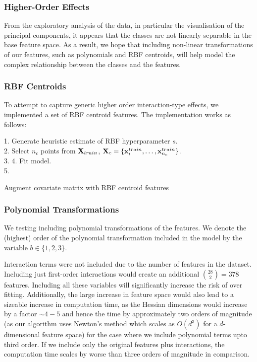 \subsubsection{Higher-Order Effects}
From the exploratory analysis of the data, in particular the visualisation of the principal components, it appears that the classes are not linearly separable in the base feature space. As a result, we hope that including non-linear transformations of our features, such as polynomials and RBF centroids, will help model the complex relationship between the classes and the features.

\subsubsection{RBF Centroids}
To attempt to capture generic higher order interaction-type effects, we implemented a set of RBF centroid features. The implementation works as follows: \newline
\begin{algorithm}[H]
    1. Generate heuristic estimate of RBF hyperparameter $s$.\\
    2. Select $n_c$ points from $\mathbf{X}_{train}$, $\mathbf{X}_c = \{\mathbf{x}^{train}_i, \dots, \mathbf{x}^{train}_{n_c}\}$.\\
    3.  
    4. Fit model.\\
    5. 
    \caption{Augment covariate matrix with RBF centroid features}
\end{algorithm}

\subsubsection{Polynomial Transformations}
We testing including polynomial transformations of the features. We denote the (highest) order of the polynomial transformation included in the model by the variable $b \in \{1,2,3\}$. 

Interaction terms were not included due to the number of features in the dataset. Including just first-order interactions would create an additional ${28 \choose 2} = 378$ features. Including all these variables will significantly increase the risk of over fitting. Additionally, the large increase in feature space would also lead to a sizeable increase in computation time, as the Hessian dimensions would increase by a factor $\sim 4-5$ and hence the time by approximately two orders of magnitude (as our algorithm uses Newton's method which scales as $O(d^3)$ for a $d$-dimensional feature space) for the case where we include polynomial terms upto third order. If we include only the original features plus interactions, the computation time scales by worse than three orders of magnitude in comparison.

